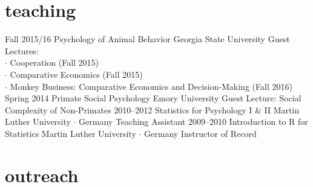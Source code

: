 \documentclass[]{friggeri-cv}
\begin{document}

\section{teaching}

\begin{entrylist}
  \entry
    {Fall 2015/16}
    {Psychology of Animal Behavior}
    {Georgia State University}
    {Guest Lectures:\\ 
    $\cdot$ Cooperation (Fall 2015)\\
    $\cdot$ Comparative Economics (Fall 2015)\\
    $\cdot$ Monkey Business: Comparative Economics and Decision-Making (Fall 2016)}
  \entry
    {Spring 2014}
    {Primate Social Psychology}
    {Emory University}
    {Guest Lecture: Social Complexity of Non-Primates}
  \entry
    {2010--2012}
    {Statistics for Psychology I \& II}
    {Martin Luther University $\cdot$ Germany}
    {Teaching Assistant}
  \entry
    {2009--2010}
    {Introduction to R for Statistics}
    {Martin Luther University $\cdot$ Germany}
    {Instructor of Record}
\end{entrylist}






\section{outreach}
\end{document}
